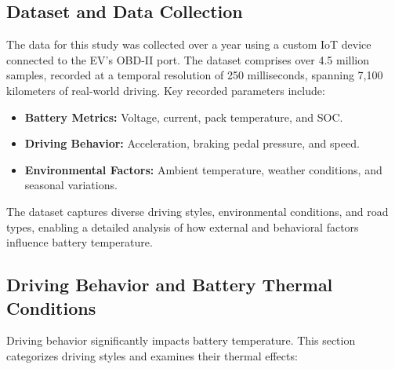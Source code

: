 \subsection{Dataset and Data Collection}
The data for this study was collected over a year using a custom IoT device connected to the \gls{EV}'s \gls{OBD-II} port. The dataset comprises over 4.5 million samples, recorded at a temporal resolution of 250 milliseconds, spanning 7,100 kilometers of real-world driving. Key recorded parameters include:

\begin{itemize}
    \item \textbf{Battery Metrics:} Voltage, current, pack temperature, and \gls{SOC}.
    \item \textbf{Driving Behavior:} Acceleration, braking pedal pressure, and speed.
    \item \textbf{Environmental Factors:} Ambient temperature, weather conditions, and seasonal variations.
\end{itemize}

The dataset captures diverse driving styles, environmental conditions, and road types, enabling a detailed analysis of how external and behavioral factors influence battery temperature.



\subsection{Driving Behavior and Battery Thermal Conditions}
Driving behavior significantly impacts battery temperature. This section categorizes driving styles and examines their thermal effects:

